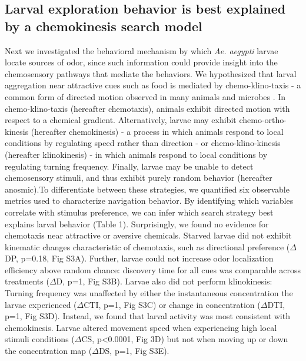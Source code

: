 \subsection*{Larval exploration behavior is best explained by a chemokinesis search model} 
\noindent Next we investigated the behavioral mechanism by which \textit{Ae. aegypti} larvae locate sources of odor, since such information could provide insight into the chemosensory pathways that mediate the behaviors. We hypothesized that larval aggregation near attractive cues such as food is mediated by chemo-klino-taxis - a common form of directed motion observed in many animals and microbes \cite{Berg1972-ch,Roder2017-pb,Hussain2016-ct}. In chemo-klino-taxis (hereafter chemotaxis), animals exhibit directed motion with respect to a chemical gradient. Alternatively, larvae may exhibit chemo-ortho-kinesis (hereafter chemokinesis) - a process in which animals respond to local conditions by regulating speed rather than direction - or chemo-klino-kinesis (hereafter klinokinesis) - in which animals respond to local conditions by regulating turning frequency. Finally, larvae may be unable to detect chemosensory stimuli, and thus exhibit purely random behavior (hereafter anosmic).To differentiate between these strategies, we quantified six observable metrics used to characterize navigation behavior. By identifying which variables correlate with stimulus preference, we can infer which search strategy best explains larval behavior (Table 1). Surprisingly, we found no evidence for chemotaxis near attractive or aversive chemicals. Starved larvae did not exhibit kinematic changes characteristic of chemotaxis, such as directional preference (${\Delta}$DP, p=0.18, Fig S3A). Further, larvae could not increase odor localization efficiency above random chance: discovery time for all cues was comparable across treatments (${\Delta}$D, p=1, Fig S3B). Larvae also did not perform klinokinesis: Turning frequency was unaffected by either the instantaneous concentration the larvae experienced (${\Delta}$CTI, p=1, Fig S3C) or change in concentration (${\Delta}$DTI, p=1, Fig S3D). Instead, we found that larval activity was most consistent with chemokinesis. Larvae altered movement speed when experiencing high local stimuli conditions (${\Delta}$CS, p<0.0001, Fig 3D) but not when moving up or down the concentration map (${\Delta}$DS, p=1, Fig S3E). 



